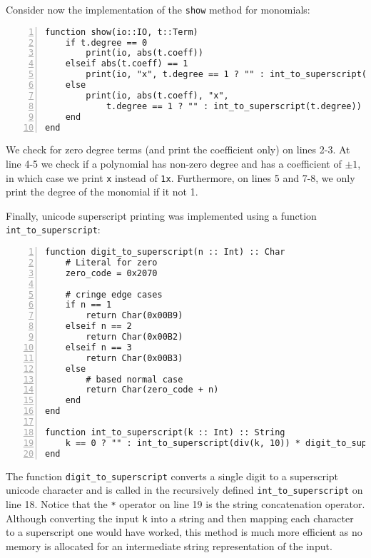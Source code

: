 \documentclass{article}
\theoremstyle{plain}
\numberwithin{theorem}{section}
\numberwithin{example}{section}
\theoremstyle{definition}
\numberwithin{definition}{section}
\begin{document}
Consider now the implementation of the \texttt{show} method for monomials:

\begin{codebox}[term.jl]
    \begin{Verbatim}[numbers=left,xleftmargin=5mm]
function show(io::IO, t::Term)
    if t.degree == 0
        print(io, abs(t.coeff))
    elseif abs(t.coeff) == 1
        print(io, "x", t.degree == 1 ? "" : int_to_superscript(t.degree))
    else
        print(io, abs(t.coeff), "x",
            t.degree == 1 ? "" : int_to_superscript(t.degree))
    end
end
    \end{Verbatim}
\end{codebox}

We check for zero degree terms (and print the coefficient only) on lines 2-3. At
line 4-5 we check if a polynomial has non-zero degree and has a coefficient of
$\pm 1$, in which case we print \texttt{x} instead of \texttt{1x}. Furthermore,
on lines 5 and 7-8, we only print the degree of the monomial if it not 1.
\medbreak

Finally, unicode superscript printing was implemented using a function
\texttt{int\_to\_superscript}:

\begin{codebox}
    \begin{Verbatim}[numbers=left,xleftmargin=5mm]
function digit_to_superscript(n :: Int) :: Char
    # Literal for zero
    zero_code = 0x2070
    
    # cringe edge cases
    if n == 1
        return Char(0x00B9)
    elseif n == 2
        return Char(0x00B2)
    elseif n == 3
        return Char(0x00B3)
    else
        # based normal case
        return Char(zero_code + n)
    end
end

function int_to_superscript(k :: Int) :: String
    k == 0 ? "" : int_to_superscript(div(k, 10)) * digit_to_superscript(mod(k, 10))
end
    \end{Verbatim}
\end{codebox}

The function \texttt{digit\_to\_superscript} converts a single digit to a
superscript unicode character and is called in the recursively defined
\texttt{int\_to\_superscript} on line 18. Notice that the \texttt{*} operator on
line 19 is the string concatenation operator. Although converting the input
\texttt{k} into a string and then mapping each character to a superscript one
would have worked, this method is much more efficient as no memory is allocated
for an intermediate string representation of the input.
\end{document}
